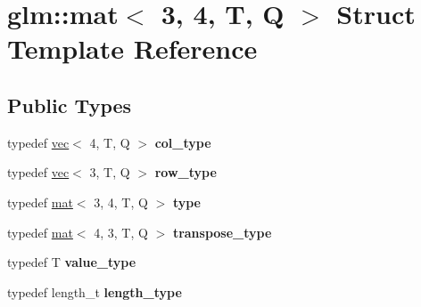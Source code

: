 \hypertarget{structglm_1_1mat_3_013_00_014_00_01T_00_01Q_01_4}{}\section{glm\+:\+:mat$<$ 3, 4, T, Q $>$ Struct Template Reference}
\label{structglm_1_1mat_3_013_00_014_00_01T_00_01Q_01_4}
\subsection*{Public Types}
\begin{DoxyCompactItemize}
\item 
\mbox{\label{structglm_1_1mat_3_013_00_014_00_01T_00_01Q_01_4_aaa23c4674cbe2dc1eda1d826b8ef721e}} 
typedef \hyperlink{structglm_1_1vec}{vec}$<$ 4, T, Q $>$ {\bfseries col\+\_\+type}
\item 
\mbox{\label{structglm_1_1mat_3_013_00_014_00_01T_00_01Q_01_4_a14121d7d6181d3e9eea914373f795c6c}} 
typedef \hyperlink{structglm_1_1vec}{vec}$<$ 3, T, Q $>$ {\bfseries row\+\_\+type}
\item 
\mbox{\label{structglm_1_1mat_3_013_00_014_00_01T_00_01Q_01_4_a6742d5174ea43a0298a2bceb2636736a}} 
typedef \hyperlink{structglm_1_1mat}{mat}$<$ 3, 4, T, Q $>$ {\bfseries type}
\item 
\mbox{\label{structglm_1_1mat_3_013_00_014_00_01T_00_01Q_01_4_af38d159b4f750dd5fab7d19b44c82731}} 
typedef \hyperlink{structglm_1_1mat}{mat}$<$ 4, 3, T, Q $>$ {\bfseries transpose\+\_\+type}
\item 
\mbox{\label{structglm_1_1mat_3_013_00_014_00_01T_00_01Q_01_4_a5fafacf57e2d28a8de693056c450088c}} 
typedef T {\bfseries value\+\_\+type}
\item 
\mbox{\label{structglm_1_1mat_3_013_00_014_00_01T_00_01Q_01_4_a6a07c3870b8e6d4ba5f1ec8fa988d9bf}} 
typedef length\+\_\+t {\bfseries length\+\_\+type}
\end{DoxyCompactItemize}
